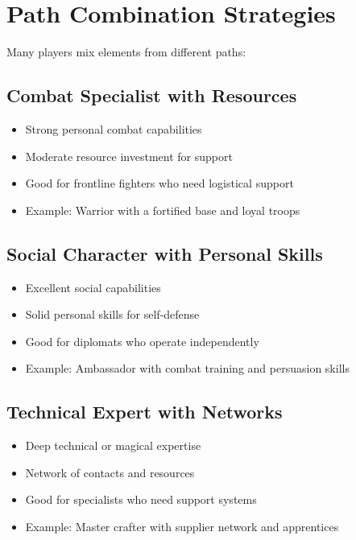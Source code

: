 \documentclass[11pt,twoside,openany]{book}
\begin{document}
\section*{Path Combination Strategies} 

Many players mix elements from different paths:

\subsection*{Combat Specialist with Resources}

\begin{itemize}
\item Strong personal combat capabilities
\item Moderate resource investment for support
\item Good for frontline fighters who need logistical support
\item Example: Warrior with a fortified base and loyal troops
\end{itemize}

\subsection*{Social Character with Personal Skills}

\begin{itemize}
\item Excellent social capabilities
\item Solid personal skills for self-defense
\item Good for diplomats who operate independently
\item Example: Ambassador with combat training and persuasion skills
\end{itemize}

\subsection*{Technical Expert with Networks}

\begin{itemize}
\item Deep technical or magical expertise
\item Network of contacts and resources
\item Good for specialists who need support systems
\item Example: Master crafter with supplier network and apprentices
\end{itemize}
\end{document}
